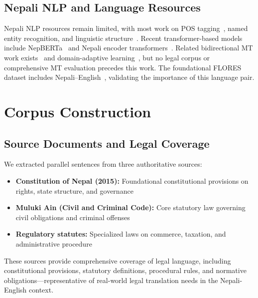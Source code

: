 \documentclass[manuscript, screen, review]{acmart}
\begin{document}
\subsection{Nepali NLP and Language Resources}
\label{subsec:nepali_nlp}

Nepali NLP resources remain limited, with most work on POS tagging~\cite{bal2018morphological}, named entity recognition, and linguistic structure~\cite{bal2004structure}. Recent transformer-based models include NepBERTa~\cite{timilsina2022nepberta} and Nepali encoder transformers~\cite{maskey2022nepali}. Related bidirectional MT work exists~\cite{poudel2024bidirectional} and domain-adaptive learning~\cite{duwal2024domain}, but no legal corpus or comprehensive MT evaluation precedes this work. The foundational FLORES dataset includes Nepali--English~\cite{guzman2019flores}, validating the importance of this language pair.

\section{Corpus Construction}
\label{sec:corpus}

\subsection{Source Documents and Legal Coverage}
\label{subsec:source_docs}

We extracted parallel sentences from three authoritative sources:

\begin{itemize}
\item \textbf{Constitution of Nepal (2015):} Foundational constitutional provisions on rights, state structure, and governance

\item \textbf{Muluki Ain (Civil and Criminal Code):} Core statutory law governing civil obligations and criminal offenses

\item \textbf{Regulatory statutes:} Specialized laws on commerce, taxation, and administrative procedure
\end{itemize}

These sources provide comprehensive coverage of legal language, including constitutional provisions, statutory definitions, procedural rules, and normative obligations—representative of real-world legal translation needs in the Nepali-English context.

\end{document}
